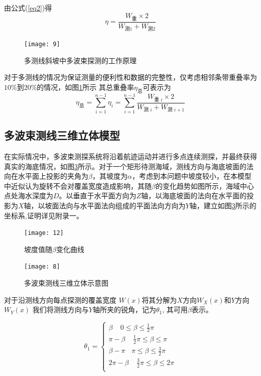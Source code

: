 \documentclass[11pt,twoside,a4paper]{article}
\begin{document}
	由公式(\ref{eq2})得	
	\begin{equation}
		\eta=\frac{W_\text{重} \times 2}{W_\text{测1}+W_\text{测2}}
	\end{equation}

\begin{figure}[h]
	\centering
	\texttt{[image: 9]}
	\caption{多测线斜坡中多波束探测的工作原理}
	\label{7}
\end{figure}
对于多测线的情况为保证测量的便利性和数据的完整性，仅考虑相邻条带重叠率为$10\%$到$20\%$的情况，如图\ref{7}所示
其总重叠率$\eta_\text{总}$可表示为
\begin{equation}
	\eta_\text{总}=\sum_{i=1}^{n-1} \eta_i=\sum_{i=1}^{n-1} \frac{W_{\text {重 } i} \times 2}{W_{\text {测 } i}+W_{\text {测 } i+1}}
\end{equation}


\subsection{多波束测线三维立体模型}
在实际情况中，多波束测探系统将沿着航迹运动并进行多点连续测探，并最终获得真实的海底情况，如图\ref{6}所示。对于一个矩形待测海域，测线方向与海底坡面的法向在水平面上投影的夹角为$\beta$，其坡度为$\alpha$，考虑到本问题中坡度较小，在本模型中近似认为旋转不会对覆盖宽度造成影响，其随$\beta$的变化趋势如图所示，海域中心点处海水深度为$D$。以垂直于水平面方向为$Z$轴，以海底坡面的法向在水平面的投影为$X$轴，以坡面法向与水平面法向组成的平面法向方向为$Y$轴，建立如图\ref{6}所示的坐标系,证明详见附录一。
 \begin{figure}[h]
	\centering
	\texttt{[image: 12]}
	\caption{坡度值随$\beta$变化曲线}
	\label{10}
\end{figure}



 \begin{figure}[h]
	\centering
	\texttt{[image: 8]}
	\caption{多波束测线三维立体示意图}
	\label{6}
\end{figure}


对于沿测线方向每点探测的覆盖宽度 $W(x)$将其分解为$X$方向$W_X(x)$和$Y$方向$W_Y(x)$
我们将测线方向与$Y$轴所夹的锐角，记为$\theta_1$,	其可用$\beta$表示。

\begin{equation}
	\theta_1=\left\{\begin{array}{l}
	     \beta   \   \    \  \   \   0 \leq \beta \leq \frac{1}{2} \pi\\
	     \pi-\beta   \   \    \  \ \ \frac{1}{2} \pi \leq \beta \leq \pi\\
	     \beta-\pi  \   \    \  \  \pi \leq \beta \leq \frac{3}{2}\pi\\
	     2\pi-\beta   \   \    \   \ \  \frac{3}{2} \pi \leq \beta \leq 2\pi\\
		
	\end{array}\right.
\end{equation}
\end{document}

